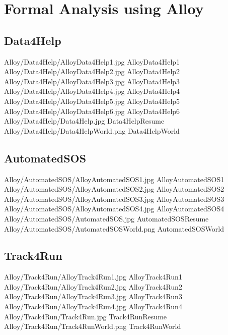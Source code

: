\documentclass[../rasd.tex]{subfiles}
\begin{document}
\chapter{Formal Analysis using Alloy}
\thispagestyle{fancy}
	\section{Data4Help}
	\image {10cm} {Alloy/Data4Help/AlloyData4Help1.jpg} {} {AlloyData4Help1}
	\image {20cm} {Alloy/Data4Help/AlloyData4Help2.jpg} {} {AlloyData4Help2}
	\image {20cm} {Alloy/Data4Help/AlloyData4Help3.jpg} {} {AlloyData4Help3}
	\image {20cm} {Alloy/Data4Help/AlloyData4Help4.jpg} {} {AlloyData4Help4}
	\image {20cm} {Alloy/Data4Help/AlloyData4Help5.jpg} {} {AlloyData4Help5}
	\image {20cm} {Alloy/Data4Help/AlloyData4Help6.jpg} {} {AlloyData4Help6}
	\image {20cm} {Alloy/Data4Help/Data4Help.jpg} {} {Data4HelpResume}
	\image {20cm} {Alloy/Data4Help/Data4HelpWorld.png} {} {Data4HelpWorld}

	\section{AutomatedSOS}
	\image {17cm} {Alloy/AutomatedSOS/AlloyAutomatedSOS1.jpg} {} {AlloyAutomatedSOS1}
	\image {20cm} {Alloy/AutomatedSOS/AlloyAutomatedSOS2.jpg} {} {AlloyAutomatedSOS2}
	\image {20cm} {Alloy/AutomatedSOS/AlloyAutomatedSOS3.jpg} {} {AlloyAutomatedSOS3}
	\image {20cm} {Alloy/AutomatedSOS/AlloyAutomatedSOS4.jpg} {} {AlloyAutomatedSOS4}
	\image {20cm} {Alloy/AutomatedSOS/AutomatedSOS.jpg} {} {AutomatedSOSResume}
	\image {20cm} {Alloy/AutomatedSOS/AutomatedSOSWorld.png} {} {AutomatedSOSWorld}

	\section{Track4Run}
	\image {20cm} {Alloy/Track4Run/AlloyTrack4Run1.jpg} {} {AlloyTrack4Run1}
	\image {20cm} {Alloy/Track4Run/AlloyTrack4Run2.jpg} {} {AlloyTrack4Run2}
	\image {20cm} {Alloy/Track4Run/AlloyTrack4Run3.jpg} {} {AlloyTrack4Run3}
	\image {20cm} {Alloy/Track4Run/AlloyTrack4Run4.jpg} {} {AlloyTrack4Run4}
	\image {20cm} {Alloy/Track4Run/Track4Run.jpg} {} {Track4RunResume}
	\image {20cm} {Alloy/Track4Run/Track4RunWorld.png} {} {Track4RunWorld}
\end{document}
